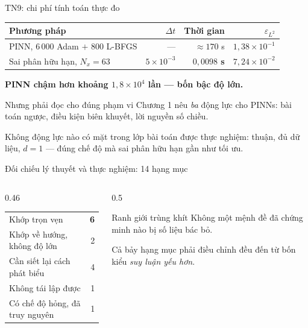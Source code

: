 \documentclass[aspectratio=169,11pt]{beamer}
\newcommand{\good}[1]{\textcolor{good}{\textbf{#1}}}
\newcommand{\bad}[1]{\textcolor{bad}{\textbf{#1}}}
\begin{document}
\begin{frame}{TN9: chi phí tính toán thực đo}
\small
\begin{table}
\small
\begin{tabular}{@{}lrrr@{}}
\toprule
\textbf{Phương pháp} & $\Delta t$ & \textbf{Thời gian} & $\varepsilon_{L^2}$ \\
\midrule
PINN, $6\,000$ Adam $+$ $800$ L-BFGS & --- & $\approx 170$ s & $1{,}38\times10^{-1}$ \\
Sai phân hữu hạn, $N_x = 63$ & $5\times10^{-3}$ & \good{$0{,}0098$ s} & $7{,}24\times10^{-2}$ \\
\bottomrule
\end{tabular}
\end{table}

\begin{center}
\bad{PINN chậm hơn khoảng $1{,}8\times10^{4}$ lần --- bốn bậc độ lớn.}
\end{center}

\medskip
\begin{block}{Nhưng phải đọc cho đúng phạm vi}
Chương 1 nêu \emph{ba} động lực cho PINNs: bài toán ngược, điều kiện biên khuyết,
lời nguyền số chiều.

\smallskip
\alert{Không động lực nào có mặt} trong lớp bài toán được thực nghiệm: thuận,
đủ dữ liệu, $d = 1$ --- đúng chế độ mà sai phân hữu hạn gần như tối ưu.
\end{block}
\end{frame}

\begin{frame}{Đối chiếu lý thuyết và thực nghiệm: 14 hạng mục}
\begin{columns}[T]
\begin{column}{0.46\textwidth}
\small
\begin{tabular}{@{}lr@{}}
\toprule
Khớp trọn vẹn & \good{6} \\
Khớp về hướng, không độ lớn & 2 \\
Cần siết lại cách phát biểu & 4 \\
Không tái lập được & 1 \\
Có chế độ hỏng, đã truy nguyên & 1 \\
\bottomrule
\end{tabular}
\end{column}
\begin{column}{0.5\textwidth}
\begin{alertblock}{Ranh giới trùng khít}
\alert{Không một mệnh đề đã chứng minh nào bị số liệu bác bỏ.}

\smallskip
Cả bảy hạng mục phải điều chỉnh đều đến từ bốn kiểu \emph{suy luận yếu hơn}.
\end{alertblock}
\end{column}
\end{columns}
\end{frame}
\end{document}
